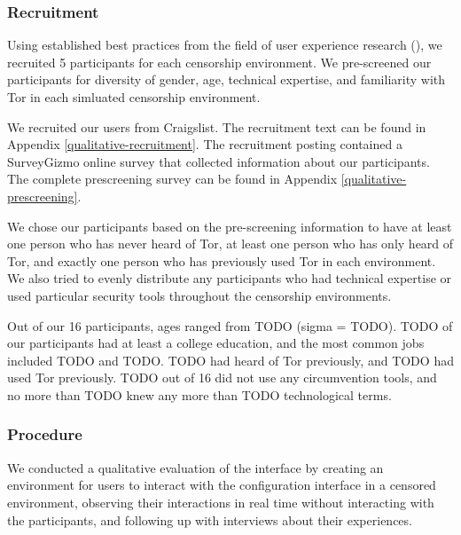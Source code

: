 \documentclass{template}
\begin{document}
\subsubsection{Recruitment}
Using established best practices from the field of user experience research
(\cite{howmanyusers}), we recruited 5 participants for each censorship environment.
We pre-screened our participants for diversity of gender, age, technical expertise,
and familiarity with Tor in each simluated censorship environment. 

We recruited our users from Craigslist. The recruitment text can be found in 
Appendix \ref{qualitative-recruitment}. The recruitment posting contained a 
SurveyGizmo online survey that collected information about our participants.
The complete prescreening survey can be found in Appendix \ref{qualitative-prescreening}.  

We chose our participants based on the pre-screening information to have 
at least one person who has never heard of Tor, at least one person who has 
only heard of Tor, and exactly one person who has previously used Tor in each
environment. We also tried to evenly distribute any participants who had technical
expertise or used particular security tools throughout the censorship environments. 

Out of our 16 participants, ages ranged from {\color {red} TODO}
(sigma = {\color {red} TODO}). {\color {red} TODO} of our participants had at least
a college education, and the most common jobs included {\color {red} TODO} and
{\color {red} TODO}. {\color {red} TODO} had heard of Tor previously, 
and {\color {red} TODO} had used Tor previously. {\color {red} TODO} out of 
16 did not use any circumvention tools, and no more than {\color {red} TODO} 
knew any more than {\color {red} TODO} technological terms.


\subsubsection{Procedure}
We conducted a qualitative evaluation of the interface by creating an environment 
for users to interact with the configuration interface in a censored environment, 
observing their interactions in real time without interacting with the participants, 
and following up with interviews about their experiences.
\end{document}
